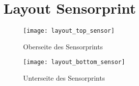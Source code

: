 \section{Layout Sensorprint}

\begin{figure}[h]
\centering
\texttt{[image: layout\_top\_sensor]}
\caption{Oberseite des Sensorprints}
\end{figure}

\begin{figure}[h]
\centering
\texttt{[image: layout\_bottom\_sensor]}
\caption{Unterseite des Sensorprints}
\end{figure}